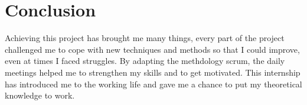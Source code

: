 \documentclass[letterpaper,10pt,english]{jupyterBook}
\begin{document}
\chapter{Conclusion}
\label{\detokenize{Conclusion/conc:conclusion}}\label{\detokenize{Conclusion/conc::doc}}
\sphinxAtStartPar
Achieving this project has brought me many things, every part of the project challenged me to cope with new techniques and methods so that I could improve, even at times I faced struggles.
By adapting the methdology scrum, the daily meetings helped me to strengthen my skills and to get motivated.
This internship has introduced me to the working life and gave me a chance to put my theoretical knowledge to work.







\renewcommand{\indexname}{Index}
\printindex
\end{document}
